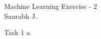 \documentclass{article}
\begin{document}
Machine Learning Exercise - 2 \\
Saurabh J.

Task 1
a
\end{document}
